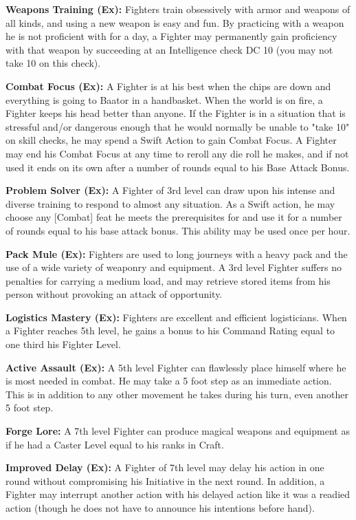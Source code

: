 \documentclass[10pt]{article}
\newcommand{\ability}[2]{\smallskip \noindent \textbf{#1} #2}
\begin{document}
\ability{Weapons Training (Ex):}{Fighters train obsessively with armor and weapons of all kinds, and using a new weapon is easy and fun. By practicing with a weapon he is not proficient with for a day, a Fighter may permanently gain proficiency with that weapon by succeeding at an Intelligence check DC 10 (you may not take 10 on this check).}

\ability{Combat Focus (Ex):}{A Fighter is at his best when the chips are down and everything is going to Baator in a handbasket. When the world is on fire, a Fighter keeps his head better than anyone. If the Fighter is in a situation that is stressful and/or dangerous enough that he would normally be unable to "take 10" on skill checks, he may spend a Swift Action to gain Combat Focus. A Fighter may end his Combat Focus at any time to reroll any die roll he makes, and if not used it ends on its own after a number of rounds equal to his Base Attack Bonus.}

\ability{Problem Solver (Ex):}{A Fighter of 3rd level can draw upon his intense and diverse training to respond to almost any situation. As a Swift action, he may choose any [Combat] feat he meets the prerequisites for and use it for a number of rounds equal to his base attack bonus. This ability may be used once per hour.}

\ability{Pack Mule (Ex):}{Fighters are used to long journeys with a heavy pack and the use of a wide variety of weaponry and equipment. A 3rd level Fighter suffers no penalties for carrying a medium load, and may retrieve stored items from his person without provoking an attack of opportunity.}

\ability{Logistics Mastery (Ex):}{Fighters are excellent and efficient logisticians. When a Fighter reaches 5th level, he gains a bonus to his Command Rating equal to one third his Fighter Level.}

\ability{Active Assault (Ex):}{A 5th level Fighter can flawlessly place himself where he is most needed in combat. He may take a 5 foot step as an immediate action. This is in addition to any other movement he takes during his turn, even another 5 foot step.}

\ability{Forge Lore:}{A 7th level Fighter can produce magical weapons and equipment as if he had a Caster Level equal to his ranks in Craft.}

\ability{Improved Delay (Ex):}{A Fighter of 7th level may delay his action in one round without compromising his Initiative in the next round. In addition, a Fighter may interrupt another action with his delayed action like it was a readied action (though he does not have to announce his intentions before hand).}
\end{document}
